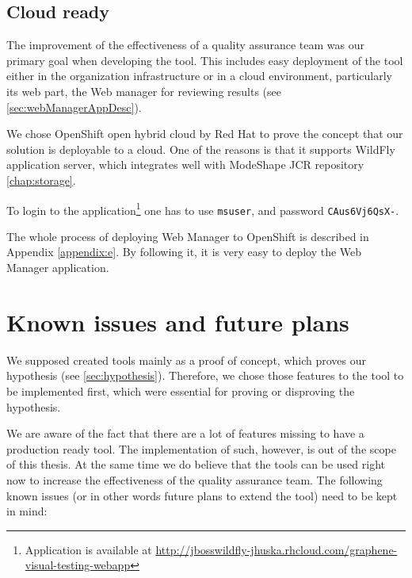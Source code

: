 \documentclass[11pt,oneside,final]{fithesis2}
\begin{document}
  \section{Cloud ready}
  \label{sec:cloudReady}
  The improvement of the effectiveness of a quality assurance team was our primary goal when developing the tool. This includes easy 
  deployment of the tool either in the organization infrastructure or in a cloud environment, particularly its web part, the
  Web manager for reviewing results (see \ref{sec:webManagerAppDesc}).
  
  We chose OpenShift open hybrid cloud by Red Hat to prove the concept that our solution is deployable to a cloud. One of the
  reasons is that it supports WildFly application server, which integrates well with ModeShape JCR repository \ref{chap:storage}.
  
  To login to the application\footnote{Application is available at 
  \url{http://jbosswildfly-jhuska.rhcloud.com/graphene-visual-testing-webapp}} one has to 
  use \texttt{msuser}, and password \texttt{CAus6Vj6QsX-}.
  
  The whole process of deploying Web Manager to OpenShift is described in Appendix \ref{appendix:e}. By following it, it is very easy
  to deploy the Web Manager application.
  
\chapter{Known issues and future plans}
We supposed created tools mainly as a proof of concept, which proves our hypothesis (see \ref{sec:hypothesis}). Therefore, we chose those features
to the tool to be implemented first, which were essential for proving or disproving the hypothesis.

We are aware of the fact that there are a lot of features missing to have a production ready tool. The implementation of such, however, is out
of the scope of this thesis. At the same time we do believe that the tools can be used right now to increase the effectiveness of the quality assurance
team. The following known issues (or in other words future plans to extend the tool) need to be kept in mind:
\end{document}
